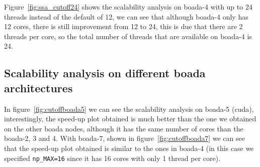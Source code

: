 Figure~\ref{fig:ssa_cutoff24} shows the scalability analysis on boada-4 with up to 24 threads instead of the
default of 12, we can see that although boada-4 only has 12 cores, there is still improvement from 12 to 24,
this is due that there are 2 threads per core, so the total number of threads that are available on boada-4
is 24.

\pagebreak
\subsection{Scalability analysis on different boada architectures}


In figure~\ref{fig:cutoffboada5} we can see the scalability analysis on boada-5 (cuda), interestingly, the speed-up
plot obtained is much better than the one we obtained on the other boada nodes, although it has the same number of
cores than the boada-2, 3 and 4. With boada-7, shown in figure~\ref{fig:cutoffboada7} we can see that the speed-up
plot obtained is similar to the ones in boada-4 (in this case we specified \texttt{np\_MAX=16} since it has 16 cores with only 1 thread per core).


